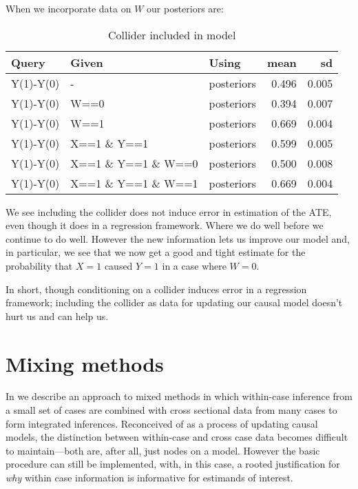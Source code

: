 \documentclass[
  12pt,
]{book}
\begin{document}
When we incorporate data on \(W\) our posteriors are:

\begin{table}

\caption{\label{tab:applearncoll8}Collider included in model}
\centering
\begin{tabular}[t]{l|l|l|r|r}
\hline
Query & Given & Using & mean & sd\\
\hline
Y(1)-Y(0) & - & posteriors & 0.496 & 0.005\\
\hline
Y(1)-Y(0) & W==0 & posteriors & 0.394 & 0.007\\
\hline
Y(1)-Y(0) & W==1 & posteriors & 0.669 & 0.004\\
\hline
Y(1)-Y(0) & X==1 \& Y==1 & posteriors & 0.599 & 0.005\\
\hline
Y(1)-Y(0) & X==1 \& Y==1 \& W==0 & posteriors & 0.500 & 0.008\\
\hline
Y(1)-Y(0) & X==1 \& Y==1 \& W==1 & posteriors & 0.669 & 0.004\\
\hline
\end{tabular}
\end{table}

We see including the collider does not induce error in estimation of the ATE, even though it does in a regression framework. Where we do well before we continue to do well. However the new information lets us improve our model and, in particular, we see that we now get a good and tight estimate for the probability that \(X=1\) caused \(Y=1\) in a case where \(W=0\).

In short, though conditioning on a collider induces error in a regression framework; including the collider as data for updating our causal model doesn't hurt us and can help us.

\hypertarget{mixing-methods}{%
\chapter{Mixing methods}\label{mixing-methods}}

In \citet{humphreys2015mixing} we describe an approach to mixed methods in which within-case inference from a small set of cases are combined with cross sectional data from many cases to form integrated inferences. Reconceived of as a process of updating causal models, the distinction between within-case and cross case data becomes difficult to maintain---both are, after all, just nodes on a model. However the basic procedure can still be implemented, with, in this case, a rooted justification for \emph{why} within case information is informative for estimands of interest.
\end{document}
